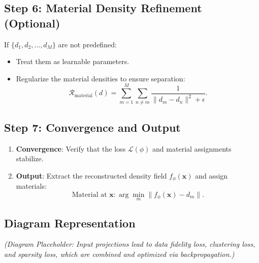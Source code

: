 \subsection{Step 6: Material Density Refinement (Optional)}
If \( \{d_1, d_2, \dots, d_M\} \) are not predefined:
\begin{itemize}
	\item Treat them as learnable parameters.
	\item Regularize the material densities to ensure separation:
	\[
	\mathcal{R}_{\text{material}}(d) = \sum_{m=1}^M \sum_{n \neq m} \frac{1}{\| d_m - d_n \|^2 + \epsilon}.
	\]
\end{itemize}

\subsection{Step 7: Convergence and Output}
\begin{enumerate}
	\item \textbf{Convergence}: Verify that the loss \( \mathcal{L}(\phi) \) and material assignments stabilize.
	\item \textbf{Output}: Extract the reconstructed density field \( f_\phi(\mathbf{x}) \) and assign materials:
	\[
	\text{Material at } \mathbf{x} : \arg \min_{m} \| f_\phi(\mathbf{x}) - d_m \|.
	\]
\end{enumerate}

\subsection{Diagram Representation}
\begin{center}
\end{center}
\textit{(Diagram Placeholder: Input projections lead to data fidelity loss, clustering loss, and sparsity loss, which are combined and optimized via backpropagation.)}


	




